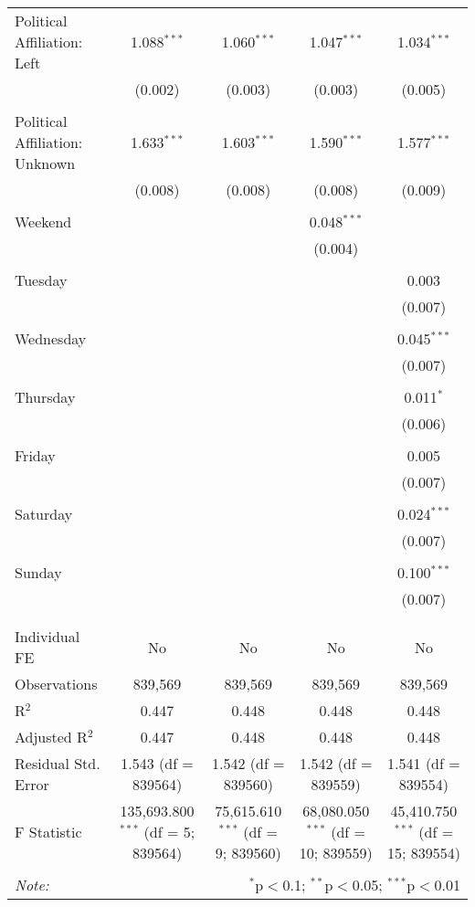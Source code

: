 \documentclass[
]{article}
\begin{document}
\begin{table}[!htbp]
{\begin{tabular}{@{\extracolsep{5pt}}lcccc}
 Political Affiliation: Left & 1.088$^{***}$ & 1.060$^{***}$ & 1.047$^{***}$ & 1.034$^{***}$ \\ 
  & (0.002) & (0.003) & (0.003) & (0.005) \\ 
  & & & & \\ 
 Political Affiliation: Unknown & 1.633$^{***}$ & 1.603$^{***}$ & 1.590$^{***}$ & 1.577$^{***}$ \\ 
  & (0.008) & (0.008) & (0.008) & (0.009) \\ 
  & & & & \\ 
 Weekend &  &  & 0.048$^{***}$ &  \\ 
  &  &  & (0.004) &  \\ 
  & & & & \\ 
 Tuesday &  &  &  & 0.003 \\ 
  &  &  &  & (0.007) \\ 
  & & & & \\ 
 Wednesday &  &  &  & 0.045$^{***}$ \\ 
  &  &  &  & (0.007) \\ 
  & & & & \\ 
 Thursday &  &  &  & 0.011$^{*}$ \\ 
  &  &  &  & (0.006) \\ 
  & & & & \\ 
 Friday &  &  &  & 0.005 \\ 
  &  &  &  & (0.007) \\ 
  & & & & \\ 
 Saturday &  &  &  & 0.024$^{***}$ \\ 
  &  &  &  & (0.007) \\ 
  & & & & \\ 
 Sunday &  &  &  & 0.100$^{***}$ \\ 
  &  &  &  & (0.007) \\ 
  & & & & \\ 
\hline \\[-1.8ex] 
Individual FE & No & No & No & No \\ 
Observations & 839,569 & 839,569 & 839,569 & 839,569 \\ 
R$^{2}$ & 0.447 & 0.448 & 0.448 & 0.448 \\ 
Adjusted R$^{2}$ & 0.447 & 0.448 & 0.448 & 0.448 \\ 
Residual Std. Error & 1.543 (df = 839564) & 1.542 (df = 839560) & 1.542 (df = 839559) & 1.541 (df = 839554) \\ 
F Statistic & 135,693.800$^{***}$ (df = 5; 839564) & 75,615.610$^{***}$ (df = 9; 839560) & 68,080.050$^{***}$ (df = 10; 839559) & 45,410.750$^{***}$ (df = 15; 839554) \\ 
\hline 
\hline \\[-1.8ex] 
\textit{Note:}  & \multicolumn{4}{r}{$^{*}$p$<$0.1; $^{**}$p$<$0.05; $^{***}$p$<$0.01} \\ 
\end{tabular}
} 
\end{table} 
\newpage
\end{document}
